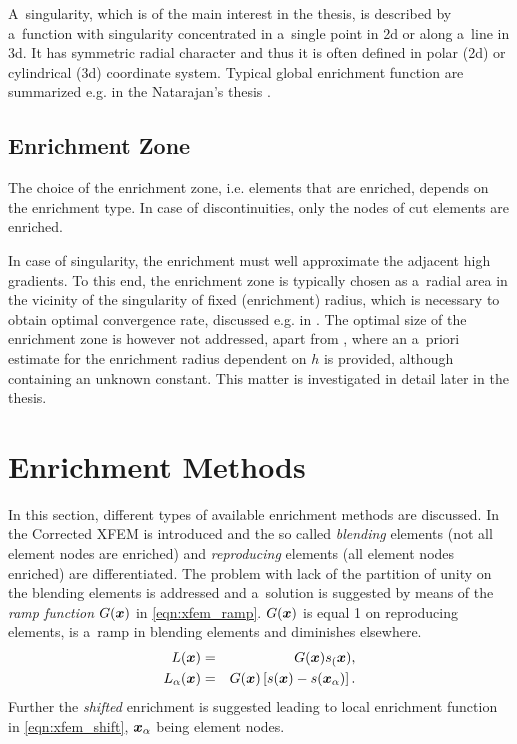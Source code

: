 A~singularity, which is of the main interest in the thesis, is described by a~function with singularity concentrated in a~single point in 2d
or along a~line in 3d. It has symmetric radial character and thus it is often defined in polar (2d) or cylindrical (3d) coordinate system.
Typical global enrichment function are summarized e.g. in the Natarajan's thesis \cite{natarajan_enriched_2011}.


\subsection{Enrichment Zone} \label{sec:glob_enr_zone}
The choice of the enrichment zone, i.e. elements that are enriched, depends on the enrichment type.
In case of discontinuities, only the nodes of cut elements are enriched.

In case of singularity, the enrichment must well approximate the adjacent high gradients.
To this end, the enrichment zone is typically chosen as a~radial area in the vicinity of the singularity
of fixed (enrichment) radius, which is necessary to obtain optimal convergence rate, discussed e.g. in \cite{fries_corrected_2008}.
The optimal size of the enrichment zone is however not addressed, apart from \cite{gupta_enr_zone_2016}, where
an a~priori estimate for the enrichment radius dependent on $h$ is provided, although containing an unknown constant.
This matter is investigated in detail later in the thesis.


 
\section{Enrichment Methods} \label{sec:enrichment_methods}
In this section, different types of available enrichment methods are discussed.
In \cite{fries_corrected_2008, fries_xfem_overview_2010} the Corrected XFEM is introduced
and the so called \emph{blending} elements (not all element nodes are enriched) and \emph{reproducing} elements
(all element nodes enriched) are differentiated. The problem with lack of the partition of unity on the blending elements is addressed
and a~solution is suggested by means of the \emph{ramp function} $G(\mathbf{\boldsymbol{x}})$ in \eqref{eqn:xfem_ramp}.
$G(\mathbf{\boldsymbol{x}})$ is equal 1 on reproducing elements, is a~ramp in blending elements and diminishes elsewhere.
\begin{eqnarray} 
    L(\mathbf{\boldsymbol{x}}) &=& G(\mathbf{\boldsymbol{x}}) s_(\mathbf{\boldsymbol{x}}), \label{eqn:xfem_ramp}\\
    L_{\alpha}(\mathbf{\boldsymbol{x}}) &=& G(\mathbf{\boldsymbol{x}}) \left[s(\mathbf{\boldsymbol{x}}) - s(\mathbf{\boldsymbol{x}}_\alpha)\right]. \label{eqn:xfem_shift}
\end{eqnarray}
Further the \emph{shifted} enrichment is suggested leading to local enrichment function in \eqref{eqn:xfem_shift},
$\mathbf{\boldsymbol{x}}_\alpha$ being element nodes.


